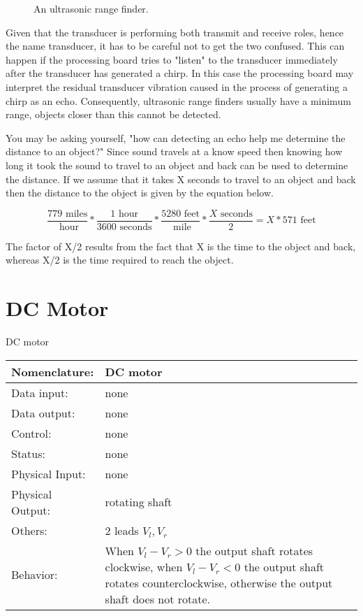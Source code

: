 \begin{figure}[ht]
\caption{An ultrasonic range finder.}
\label{fig:commonPeripheralComponentsultra}
\end{figure}

Given that the transducer is performing both transmit and receive
roles, hence the name transducer, it has to be careful not to get 
the two confused.  This can
happen if the processing board tries to "listen" to the transducer
immediately after the transducer has generated a chirp.  In this case
the processing board may interpret the residual transducer vibration
caused in the process of generating a chirp as an echo.  Consequently,
ultrasonic range finders 
usually have a minimum range, objects closer than this cannot be detected.

You may be asking yourself, "how can detecting an echo help me determine
the distance to an object?"  Since sound travels at a know speed
then knowing how long it took the sound to travel
to an object and back can be used to determine the distance.  If we assume
that it takes X seconds to travel to an object and back then the distance
to the object is given by the equation below.

$$	\frac{779 \text{ \ miles}}{\text{ \ hour}} * 
	\frac{1 \text{ \ hour}} {3600 \text{ \ seconds}} * 
	\frac{5280 \text{ \ feet}}{\text{ \ mile}} * 
	\frac{X \text{ \ seconds}}{2} =
	X * 571 \text{ \ feet} $$

The factor of X/2 results from the fact that X is the time to the 
object and back, whereas X/2 is the time required to reach the object. 




\section{DC Motor}
\label{page:dvmotor}
\begin{buildingblock}{DC motor}
\begin{tabular}{|l|p{3.5in}|} \hline
Nomenclature:  & DC motor  \\ \hline
Data input:    & none    \\ \hline
Data output:   & none     \\ \hline
Control:       & none     \\ \hline
Status:        & none      \\ \hline
Physical Input:& none		\\ \hline
Physical Output:& rotating shaft		\\ \hline
Others:        & 2 leads $V_l, V_r$      \\ \hline
Behavior:      & When $V_l-V_r > 0$ the output shaft rotates clockwise, 
when $V_l-V_r < 0$ the output shaft rotates counterclockwise, otherwise the
output shaft does not rotate. \\ \hline
\end{tabular}
\end{buildingblock}

